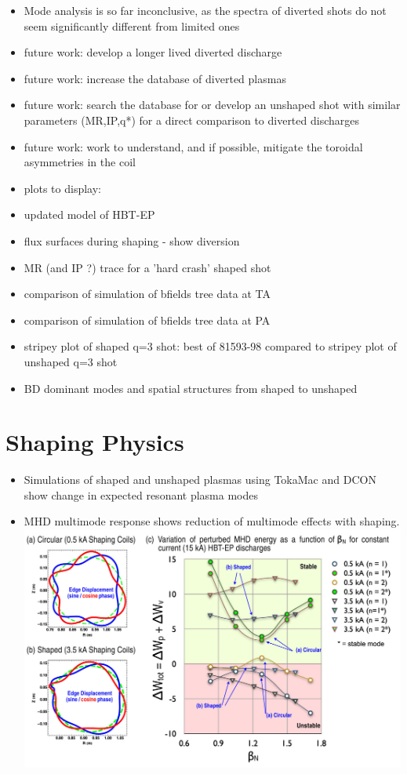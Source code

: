 \documentclass{article}
\begin{document}
\begin{multicols}{5}
\begin{itemize}
\item Mode analysis is so far inconclusive, as the spectra of diverted shots do not seem significantly different from limited ones
\item future work: develop a longer lived diverted discharge
\item future work: increase the database of diverted plasmas
\item future work: search the database for or develop an unshaped shot with similar parameters (MR,IP,q*) for a direct comparison to diverted discharges
\item future work: work to understand, and if possible, mitigate the toroidal asymmetries in the coil
\item plots to display:
\item updated model of HBT-EP
\item flux surfaces during shaping - show diversion
\item MR (and IP ?) trace for a 'hard crash' shaped shot
\item comparison of simulation of bfields tree data at TA
\item comparison of simulation of bfields tree data at PA
\item stripey plot of shaped q=3 shot: best of 81593-98 compared to stripey plot of unshaped q=3 shot
\item BD dominant modes and spatial structures from shaped to unshaped


\end{itemize}

\section{Shaping Physics}

\begin{itemize}
\item Simulations of shaped and unshaped plasmas using TokaMac and DCON show change in expected resonant plasma modes
\item MHD multimode response shows reduction of multimode effects with shaping.\\

\includegraphics[width=0.9\columnwidth]{ModeDWimage2}



\end{itemize}
\end{multicols}
\end{document}
